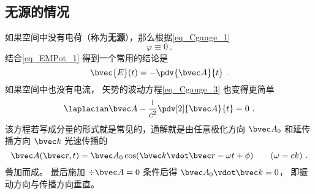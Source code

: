 \subsection{无源的情况}
如果空间中没有电荷（称为\textbf{无源}），那么根据\autoref{eq_Cgauge_1}
\begin{equation}\label{eq_Cgauge_5}
\varphi \equiv 0~.
\end{equation}
结合\autoref{eq_EMPot_1} 得到一个常用的结论是
\begin{equation}\label{eq_Cgauge_2}
\bvec {E}(t) = -\pdv{\bvec A}{t}~.
\end{equation}
如果空间中也没有电流， 矢势的波动方程\autoref{eq_Cgauge_3} 也变得更简单
\begin{equation}
\laplacian \bvec A - \frac{1}{c^2} \pdv[2]{\bvec A}{t} = 0~.
\end{equation}
该方程若写成分量的形式就是常见的，通解就是由任意极化方向 $\bvec A_0$ 和延传播方向 $\bvec k$ 光速传播的
\begin{equation}
\bvec A(\bvec r, t) = \bvec A_0 \cos(\bvec k \vdot \bvec r - \omega t + \phi) \qquad (\omega = ck)~.
\end{equation}
叠加而成。 最后施加 $\div \bvec A = 0$ 条件后得 $\bvec A_0 \vdot \bvec k = 0$， 即振动方向与传播方向垂直。

